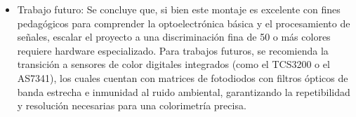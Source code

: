 \documentclass[conference]{IEEEtran}
\begin{document}
\begin{itemize}
    \item Trabajo futuro: Se concluye que, si bien este montaje es excelente con fines pedagógicos para comprender la optoelectrónica básica y el procesamiento de señales, escalar el proyecto a una discriminación fina de 50 o más colores requiere hardware especializado. Para trabajos futuros, se recomienda la transición a sensores de color digitales integrados (como el TCS3200 o el AS7341), los cuales cuentan con matrices de fotodiodos con filtros ópticos de banda estrecha e inmunidad al ruido ambiental, garantizando la repetibilidad y resolución necesarias para una colorimetría precisa.
\end{itemize}



\end{document}
